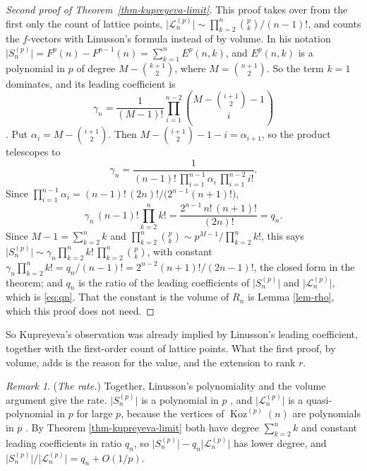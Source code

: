 \documentclass[11pt, a4paper, abstract=yes]{scrartcl}
\theoremstyle{definition}
\theoremstyle{remark}
\newtheorem{remark}[definition]{Remark}
\theoremstyle{plain}
\theoremstyle{remark}
\theoremstyle{plain}
\newcommand{\Koz}{\operatorname{Koz}}
\begin{document}
\begin{proof}[Second proof of Theorem~\ref{thm-kupreyeva-limit}]
This proof takes over from the first only the count of lattice points,
\(\lvert\mathcal L_n^{(p)}\rvert\sim\prod_{k=2}^n\binom pk/(n-1)!\), and counts the \(f\)-vectors with
Linusson's formula instead of by volume. In his
notation \(\lvert S_n^{(p)}\rvert=F^p(n)-F^{p-1}(n)=\sum_{k=1}^nE^p(n,k)\), and \(E^p(n,k)\) is a
polynomial in \(p\) of degree \(M-\binom{k+1}2\), where \(M=\binom{n+1}2\). So
the term \(k=1\) dominates, and its leading coefficient is
\begin{equation}\label{eq:linusson}
  \gamma_n=\frac1{(M-1)!}\prod_{i=1}^{n-2}\binom{M-\binom{i+1}2-1}{i}
\end{equation}
\autocite[Theorem 3.3, and Proposition 2.8 with its proof]{Linusson1999}. Put
\(\alpha_i=M-\binom{i+1}2\). Then \(M-\binom{i+1}2-1-i=\alpha_{i+1}\), so the product telescopes to
\[
  \gamma_n=\frac{1}{(n-1)!\,\prod_{i=1}^{n-1}\alpha_i\,\prod_{i=1}^{n-2}i!} .
\]
Since \(\prod_{i=1}^{n-1}\alpha_i=(n-1)!\,(2n)!/\bigl(2^{n-1}(n+1)!\bigr)\),
\[
  \gamma_n\,(n-1)!\prod_{k=2}^nk!=\frac{2^{n-1}\,n!\,(n+1)!}{(2n)!}=q_n .
\]
Since \(M-1=\sum_{k=2}^nk\) and \(\prod_{k=2}^n\binom pk\sim p^{M-1}/\prod_{k=2}^nk!\), this says
\(\lvert S_n^{(p)}\rvert\sim\gamma_n\prod_{k=2}^nk!\,\prod_{k=2}^n\binom pk\), with constant
\(\gamma_n\prod_{k=2}^nk!=q_n/(n-1)!=2^{n-2}(n+1)!/(2n-1)!\), the closed form in the theorem; and
\(q_n\) is the ratio of the leading coefficients of \(\lvert S_n^{(p)}\rvert\) and
\(\lvert\mathcal L_n^{(p)}\rvert\), which is \eqref{eq:qn}. That the constant is the volume of \(R_n\)
is Lemma \ref{lem-rho}, which this proof does not need.
\end{proof}

So Kupreyeva's observation was already implied by Linusson's leading coefficient, together with the
first-order count of lattice points. What the first proof, by volume, adds is the reason for the
value, and the extension to rank \(r\).

\begin{remark}
(\emph{The rate.}) Together, Linusson's polynomiality and the volume argument give the rate. \(\lvert S_n^{(p)}\rvert\)
is a polynomial in \(p\) \autocite{Linusson1999},
and \(\lvert\mathcal L_n^{(p)}\rvert\) is a quasi-polynomial in \(p\) for large \(p\), because the
vertices of \(\Koz^{(p)}(n)\) are polynomials in \(p\) \autocite[Theorem 1.4]{ChenLiSam2012}. By
Theorem \ref{thm-kupreyeva-limit} both have degree \(\sum_{k=2}^nk\) and constant leading coefficients in
ratio \(q_n\), so \(\lvert S_n^{(p)}\rvert-q_n\lvert\mathcal L_n^{(p)}\rvert\) has lower degree, and
\(\lvert S_n^{(p)}\rvert/\lvert\mathcal L_n^{(p)}\rvert=q_n+O(1/p)\).
\label{rem-kupreyeva-linusson}
\end{remark}
\end{document}
